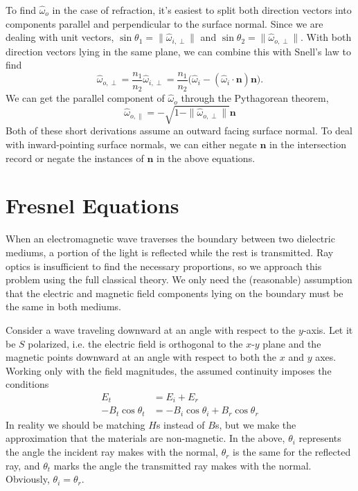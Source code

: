 \documentclass{article}
\begin{document}
To find $\hat{\omega}_o$ in the case of refraction, it's easiest to split both direction vectors into components parallel and perpendicular to the surface normal. Since we are dealing with unit vectors, $\sin\theta_1 = \|\hat{\omega}_{i,\perp}\|$ and $\sin\theta_2 = \|\hat{\omega}_{o,\perp}\|$. With both direction vectors lying in the same plane, we can combine this with Snell's law to find
\[
	\hat{\omega}_{o,\perp} = \frac{n_1}{n_2}\hat{\omega}_{i,\perp} = \frac{n_1}{n_2}\big(\hat{\omega}_i - (\hat{\omega}_i\cdot\mathbf{n})\mathbf{n}\big).
\]
We can get the parallel component of $\hat{\omega}_o$ through the Pythagorean theorem,
\[
	\hat{\omega}_{o,\parallel} = -\sqrt{1 - \|\hat{\omega}_{o,\perp}\|}\mathbf{n}
\]
Both of these short derivations assume an outward facing surface normal. To deal with inward-pointing surface normals, we can either negate $\mathbf{n}$ in the intersection record or negate the instances of $\mathbf{n}$ in the above equations.

\section*{Fresnel Equations}

When an electromagnetic wave traverses the boundary between two dielectric mediums, a portion of the light is reflected while the rest is transmitted. Ray optics is insufficient to find the necessary proportions, so we approach this problem using the full classical theory. We only need the (reasonable) assumption that the electric and magnetic field components lying on the boundary must be the same in both mediums.

Consider a wave traveling downward at an angle with respect to the $y$-axis. Let it be $S$ polarized, i.e. the electric field is orthogonal to the $x$-$y$ plane and the magnetic points downward at an angle with respect to both the $x$ and $y$ axes. Working only with the field magnitudes, the assumed continuity imposes the conditions
\begin{align*}
	E_t &= E_i + E_r \\
	-B_t\cos\theta_t &= -B_i\cos\theta_i + B_r\cos\theta_r
\end{align*}
In reality we should be matching $H$s instead of $B$s, but we make the approximation that the materials are non-magnetic. In the above, $\theta_i$ represents the angle the incident ray makes with the normal, $\theta_r$ is the same for the reflected ray, and $\theta_t$ marks the angle the transmitted ray makes with the normal. Obviously, $\theta_i = \theta_r$.
\end{document}
